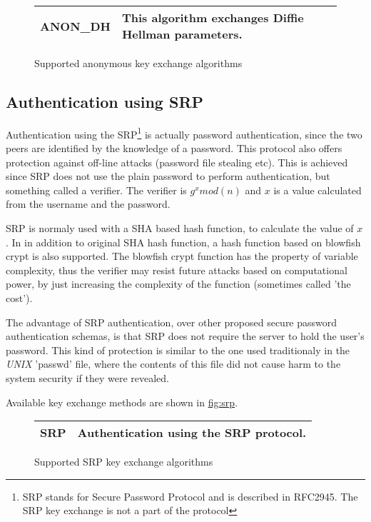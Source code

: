 \begin{figure}[hbtp]
\begin{tabular}{|l|p{9cm}|}

\hline
ANON\_DH & This algorithm exchanges Diffie Hellman parameters. 
\\
\hline
\end{tabular}

\caption{Supported anonymous key exchange algorithms}
\label{fig:anon}

\end{figure}

\subsection{Authentication using SRP}
Authentication using the SRP\footnote{SRP stands for Secure Password Protocol and 
is described in RFC2945. The SRP key exchange is not a part of the \tlsI protocol}
is actually password authentication, since the two peers are identified by the knowledge of a password. 
This protocol also offers protection against off-line attacks (password file stealing etc). 
This is achieved since SRP does not use the plain password to perform authentication, but something called a 
verifier. The verifier is $g^{x}mod(n)$ and $x$ is a value calculated
from the username and the password. 
\par SRP is normaly used with a SHA based hash function, to calculate
the value of $x$. In \gnutls{} in addition to original SHA hash function,
a hash function based on blowfish crypt is also supported. The blowfish
crypt function has the property of variable complexity, thus the
verifier may resist future attacks based on computational power, by just increasing
the complexity of the function (sometimes called 'the cost').
\par The advantage of SRP authentication, over other proposed secure password 
authentication schemas, is that SRP does not require the server to hold
the user's password. This kind of protection is similar to the one used traditionaly
in the \emph{UNIX} 'passwd' file, where the contents of this file did not cause
harm to the system security if they were revealed.
\par
Available key exchange methods are shown in \hyperref{figure}{figure }{}{fig:srp}.

\begin{figure}[hbtp]
\begin{tabular}{|l|p{9cm}|}

\hline
SRP & Authentication using the SRP protocol. 
\\
\hline
\end{tabular}

\caption{Supported SRP key exchange algorithms}
\label{fig:srp}

\end{figure}
